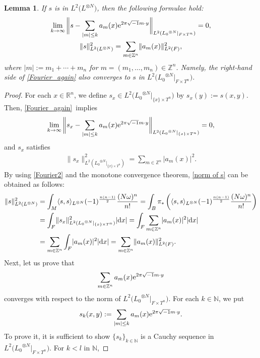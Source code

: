 \documentclass[10pt,a4paper]{amsart}
\numberwithin{equation}{section}
\newtheorem{Lemma}[Theorem]{Lemma}
\newcommand{\R}{\mathbb{R}}
\newcommand{\Z}{\mathbb{Z}}
\newcommand{\N}{\mathbb{N}}
\newcommand{\abs}[1]{\lvert#1\rvert}
\newcommand{\norm}[1]{\lVert#1\rVert}
\begin{document}
\begin{Lemma}\label{convergence in F times T}
If $s$ is in $L^2\bigl(L^{\otimes N}\bigr)$, then the following formulae hold:
\begin{gather}
 \lim_{k\to \infty}\bigg\lVert s-\sum_{\abs{m}\le k}a_m(x){\rm e}^{2\pi\sqrt{-1}m\cdot y}\bigg\rVert_{L^2({L_0}^{\otimes N}|_{F\times T^n})}=0, \label{Fourier series for s}\nonumber\\
\norm{s}_{L^2(L^{\otimes N})}^2=\sum_{m\in \Z^n}\norm{a_m(x)}_{L^2(F)}^2,\label{norm of s}
\end{gather}
where $\abs{m}:=m_1+\cdots +m_n$ for $m=(m_1,\ldots ,m_n)\in \Z^n$. Namely, the right-hand side of \eqref{Fourier_again} also converges to $s$ in $L^2\bigl({L_0}^{\otimes N}|_{F\times T^n}\bigr)$.
\end{Lemma}
\begin{proof}
For each $x\in \R^n$, we define $s_x\in L^2\bigl({L_0}^{\otimes N}|_{\{x\}\times T^n}\bigr)$ by $s_x(y):=s(x,y)$. Then, \eqref{Fourier_again}~implies
\begin{gather}
\lim_{k\to \infty}\bigg\lVert s_x-\sum_{\abs{m}\le k}a_m(x){\rm e}^{2\pi\sqrt{-1}m\cdot y}\bigg\rVert_{L^2({L_0}^{\otimes N}|_{\{x\}\times T^n})}=0, \label{Fourier1}
\end{gather}
and $s_x$ satisfies
\begin{gather}
\norm{s_x}_{L^2({L_0}^{\otimes N}|_{\{x\}\times T^n})}^2=\sum_{m\in \Z^n}\abs{a_m(x)}^2.\label{Fourier2}
\end{gather}
By using \eqref{Fourier2} and the monotone convergence theorem, \eqref{norm of s} can be obtained as follows:
\begin{align*}
\norm{s}_{L^2(L^{\otimes N})}^2&=\int_M\langle s, s\rangle_{L^{\otimes N}} (-1)^{\frac{n(n-1)}{2}}\dfrac{(N\omega)^n}{n!}=\int_B\pi_*\left(\langle s, s\rangle_{L^{\otimes N}} (-1)^{\frac{n(n-1)}{2}}\dfrac{(N\omega)^n}{n!}\right) \\
&=\int_F\norm{s_x}_{L^2({L_0}^{\otimes N}|_{\{x\}\times T^n})}^2\abs{{\rm d}x} =\int_F\sum_{m\in \Z^n}\abs{a_m(x)}^2\abs{{\rm d}x} \\
&=\sum_{m\in \Z^n}\int_F\abs{a_m(x)}^2\abs{{\rm d}x} =\sum_{m\in \Z^n}\norm{a_m(x)}_{L^2(F)}^2.
\end{align*}
Next, let us prove that
\[\sum_{m\in \Z^n}a_m(x){\rm e}^{2\pi\sqrt{-1}m\cdot y}
\]
 converges with respect to the norm of $L^2\bigl({L_0}^{\otimes N}|_{F\times T^n}\bigr)$. For each $k\in \N$, we put
 \[s_k(x,y):=\sum_{\abs{m}\le k}a_m(x){\rm e}^{2\pi\sqrt{-1}m\cdot y}.
 \]
 To prove it, it is sufficient to show $\{s_k\}_{k\in \N}$ is a Cauchy sequence in $L^2\bigl({L_0}^{\otimes N}|_{F\times T^n}\bigr)$. For $k<l$ in $\N$,

\end{proof}
\end{document}
